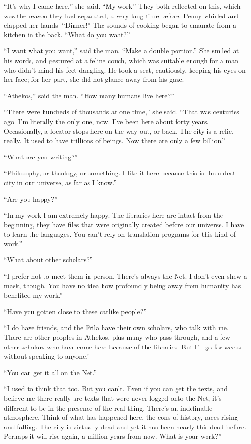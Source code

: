 \documentclass[english,11pt,letterpaper,onecolumn]{scrbook}
\begin{document}
	``It's why I came here,'' she said.  ``My work.''  They both reflected on this, which was the reason they had separated, a very long time before.  Penny whirled and clapped her hands.  ``Dinner!''  The sounds of cooking began to emanate from a kitchen in the back.  ``What do you want?''

	``I want what you want,'' said the man.  ``Make a double portion.''  She smiled at his words, and gestured at a feline couch, which was suitable enough for a man who didn't mind his feet dangling.  He took a seat, cautiously, keeping his eyes on her face; for her part, she did not glance away from his gaze.

	``Athekos,'' said the man.  ``How many humans live here?''

	``There were hundreds of thousands at one time,'' she said.  ``That was centuries ago.  I'm literally the only one, now.  I've been here about forty years.  Occasionally, a locator stops here on the way out, or back.  The city is a relic, really.  It used to have trillions of beings.  Now there are only a few billion.''

	``What are you writing?''

	``Philosophy, or theology, or something.  I like it here because this is the oldest city in our universe, as far as I know.''

	``Are you happy?''

	``In my work I am extremely happy.  The libraries here are intact from the beginning, they have files that were originally created before our universe.  I have to learn the languages.  You can't rely on translation programs for this kind of work.''

	``What about other scholars?''

	``I prefer not to meet them in person.  There's always the Net.  I don't even show a mask, though.  You have no idea how profoundly being away from humanity has benefited my work.''

	``Have you gotten close to these catlike people?''

	``I do have friends, and the Frila have their own scholars, who talk with me.  There are other peoples in Athekos, plus many who pass through, and a few other scholars who have come here because of the libraries.  But I'll go for weeks without speaking to anyone.''

	``You can get it all on the Net.''

	``I used to think that too.  But you can't.  Even if you can get the texts, and believe me there really are texts that were never logged onto the Net, it's different to be in the presence of the real thing.  There's an indefinable atmosphere.  Think of what has happened here, the eons of history, races rising and falling.  The city is virtually dead and yet it has been nearly this dead before.  Perhaps it will rise again, a million years from now.  What is your work?''
\end{document}
